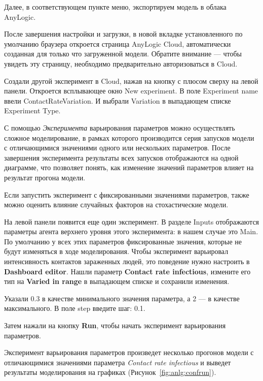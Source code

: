 Далее, в соответствующем пункте меню, экспортируем модель
в облака AnyLogic.\par
После завершения настройки и загрузки, в новой вкладке установленного по
умолчанию браузера откроется страница AnyLogic Cloud, автоматически
созданная для только что загруженной модели. Обратите внимание --- чтобы
увидеть эту страницу, необходимо предварительно авторизоваться в Cloud.\par
Создали другой эксперимент в Cloud, нажав на кнопку с плюсом
сверху на левой панели. Откроется всплывающее окно New experiment.
В поле Experiment name ввели ContactRateVariation.
И выбрали Variation в выпадающем списке Experiment Type.\par
С помощью \textit{Эксперимента} варьирования параметров можно осуществлять
сложное моделирование, в рамках которого производится серия запусков
модели с отличающимися значениями одного или нескольких параметров.
После завершения эксперимента результаты всех запусков отображаются на
одной диаграмме, что позволяет понять, как изменение значений параметров
влияет на результат прогона модели.\par
Если запустить эксперимент с фиксированными значениями параметров, также
можно оценить влияние случайных факторов на стохастические модели.\par
На левой панели появится еще один эксперимент. В разделе Inputs
отображаются параметры агента верхнего уровня этого эксперимента: в
нашем случае это Main. По умолчанию у всех этих параметров
фиксированные значения, которые не будут изменяться в ходе
моделирования. Чтобы эксперимент варьировал интенсивность
контактов зараженных людей, это поведение нужно настроить в \textbf{Dashboard
editor}.
Нашли параметр \textbf{Contact rate infectious}, измените его тип на
\textbf{Varied in range} в выпадающем списке и сохранили изменения.\par
Указали 0.3 в качестве минимального значения параметра, а 2 --- в качестве
максимального. В поле step введите шаг: 0.1.\par
Затем нажали на кнопку \textbf{Run}, чтобы начать эксперимент варьирования
параметров.\par
Эксперимент варьирования параметров произведет несколько прогонов модели
с отличающимися значениями параметра \textit{Contact rate infectious}
и выведет результаты моделирования на графиках
(Рисунок~\ref{fig:anlg:confrun}).

